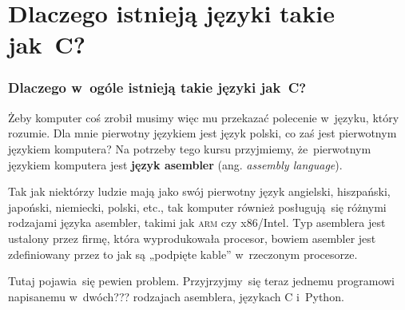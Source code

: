 \documentclass[10pt,t]{beamer}
\begin{document}
\section{Dlaczego istnieją języki takie jak~C?}



\begin{frame}
  \frametitle{Dlaczego w~ogóle istnieją takie języki jak~C?}

  \pause


  Żeby komputer coś zrobił musimy więc mu przekazać polecenie w~języku,
  który rozumie. Dla mnie pierwotny językiem jest język polski, co zaś
  jest pierwotnym językiem komputera? Na potrzeby tego kursu przyjmiemy,
  że~pierwotnym językiem komputera jest \textbf{język asembler}
  (ang. \textit{assembly language}).

  Tak jak niektórzy ludzie mają jako swój pierwotny język angielski,
  hiszpański, japoński, niemiecki, polski, etc., tak komputer również
  posługują~się różnymi rodzajami języka asembler, takimi jak \textsc{arm}
  czy x86/Intel. Typ asemblera jest ustalony przez firmę, która
  wyprodukowała procesor, bowiem asembler jest zdefiniowany przez to jak są
  „podpięte kable” w~rzeczonym procesorze.

  Tutaj pojawia~się pewien problem. Przyjrzyjmy~się teraz jednemu programowi
  napisanemu w~dwóch??? rodzajach asemblera, językach C i~Python.

\end{frame}
\end{document}
